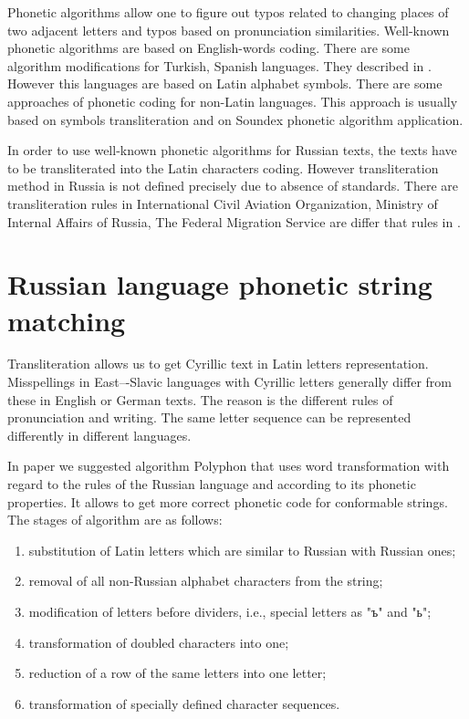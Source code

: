 \documentclass{svproc}
\begin{document}
Phonetic algorithms allow one to figure out typos related to changing places of two adjacent letters and typos based on pronunciation similarities. Well-known phonetic algorithms are based on English-words coding. There are some algorithm modifications for Turkish, Spanish languages. They described in \cite{Alotaibi-2013}. However this languages are based on Latin alphabet symbols. There are some approaches of phonetic coding for non-Latin languages. This approach is usually based on symbols transliteration and on Soundex phonetic algorithm \cite{Soundex} application.

In order to use well-known phonetic algorithms for Russian texts, the texts have to be transliterated into the Latin characters coding. However transliteration method in Russia is not defined precisely due to absence of standards. There are  transliteration rules in International Civil Aviation Organization, Ministry of Internal Affairs of Russia, The Federal Migration Service are differ that rules in \cite{GOST-2006}.

\section{Russian language phonetic string matching}
Transliteration allows us to get Cyrillic text in Latin letters representation. Misspellings in East–-Slavic languages with Cyrillic letters generally differ from these in English or German texts. The reason is the different rules of pronunciation and writing.  The same letter sequence can be represented differently in different languages.

In paper \cite{Paramonov-2016} we suggested algorithm Polyphon that uses word transformation with regard to the rules of the Russian language and according to its phonetic properties. It allows to get more correct phonetic code for conformable strings. The stages of algorithm are as follows:

\begin{enumerate}
\item substitution of Latin letters which are similar to Russian with Russian ones;
\item removal of all non-Russian alphabet characters from the string;
\item modification of letters before dividers, i.e., special letters as "ъ" and "ь";
\item transformation of doubled characters into one;
\item reduction of a row of the same letters into one letter;
\item transformation of specially defined character sequences.
\end{enumerate}
\end{document}
